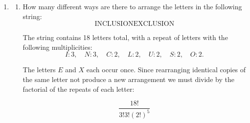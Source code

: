 \documentclass{article}
\begin{document}
\begin{enumerate}
\begin{enumerate}
      \item Paintings A,B, and C are all painted by the same artist. How many ways can the
      museum curator arrange all 9 paintings among the 12 rooms such that paintings A,B, and C are
      all in the same room?
      We can consider paintings A, B, and C to be one set or basically one painting and so now we have 7 paintings being placed in 12 rooms
      So the total number of arrangements for all 9 paintings when A,B, and C must be in the same room is:
      \[
        =  12^{7}
      \]
      \item How many ways can the museum curator arrange all 9 paintings in 3 of the 12 rooms
      such that each room has exactly 3 paintings?
      Given that each room has exactly 3 paintings it means that 3 rooms will be used at a time, so we can think of it in the perspective of those 3 rooms.
      \begin{itemize}
        \item First you have 12 rooms and you need to choose 3 rooms = $\binom{12}{3}$
        \item For the first room you have 9 paintings now and need 3 = $\binom{9}{3}$
        \item Same thing for the second =  $\binom{6}{3}$
        \item Same thing for the third  =  $\binom{3}{3}$
      \end{itemize}
      Thus the total number of ways is equal to product of each room:
      \[ 
        = \binom{12}{3} \cdot \binom{9}{3} \cdot \binom{6}{3} \cdot \binom{3}{3}
      \]
    \end{enumerate}
   
 \item
 \begin{enumerate}

 \item How many different ways are there to arrange the letters in the following string:
 \[ 
 \text{INCLUSIONEXCLUSION}
 \]

 The string contains 18 letters total, with a repeat of letters with the following multiplicities:
 \[
 I:3, \quad N:3, \quad C:2, \quad L:2, \quad U:2, \quad S:2, \quad O:2.
 \]

 The letters $E$ and $X$ each occur once. Since rearranging identical copies of the same letter not produce a new arrangement we must divide by the factorial of the repeats of each letter:

 \[ 
 \boxed{ 
 \frac{18!}{3!3!(2!)^5}
 }
 \]


\end{enumerate}
\end{enumerate}
\end{document}

